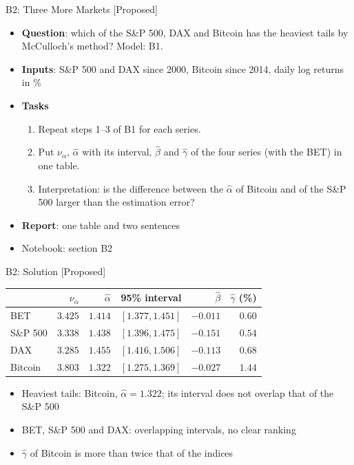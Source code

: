 \begin{frame}{B2: Three More Markets [Proposed]}
\itemsize{\footnotesize}
\begin{itemize}
\item \textbf{Question}: which of the S\&P 500, DAX and Bitcoin has the heaviest tails by McCulloch's method? Model: B1.
\item \textbf{Inputs}: S\&P 500 and DAX since 2000, Bitcoin since 2014, daily log returns in \%
\item \textbf{Tasks}
\begin{enumerate}
    \item Repeat steps 1--3 of B1 for each series.
    \item Put $\nu_\alpha$, $\hat\alpha$ with its interval, $\hat\beta$ and $\hat\gamma$ of the four series (with the BET) in one table.
    \item Interpretation: is the difference between the $\hat\alpha$ of Bitcoin and of the S\&P 500 larger than the estimation error?
\end{enumerate}
\item \textbf{Report}: one table and two sentences
\item Notebook: section B2
\end{itemize}
\end{frame}

\ifsolutions
\begin{frame}{B2: Solution [Proposed]}
\itemsize{\footnotesize}
\begin{center}
\footnotesize
\begin{tabular}{lrrrrr}
\toprule
& $\nu_\alpha$ & $\hat\alpha$ & 95\% interval & $\hat\beta$ & $\hat\gamma$ (\%) \\
\midrule
BET & $3.425$ & $1.414$ & $[1.377, 1.451]$ & $-0.011$ & $0.60$ \\
S\&P 500 & $3.338$ & $1.438$ & $[1.396, 1.475]$ & $-0.151$ & $0.54$ \\
DAX & $3.285$ & $1.455$ & $[1.416, 1.506]$ & $-0.113$ & $0.68$ \\
Bitcoin & $3.803$ & $1.322$ & $[1.275, 1.369]$ & $-0.027$ & $1.44$ \\
\bottomrule
\end{tabular}
\end{center}
\begin{itemize}
    \item Heaviest tails: Bitcoin, $\hat\alpha = 1.322$; its interval does not overlap that of the S\&P 500
    \item BET, S\&P 500 and DAX: overlapping intervals, no clear ranking
    \item $\hat\gamma$ of Bitcoin is more than twice that of the indices
\end{itemize}
\end{frame}
\fi

